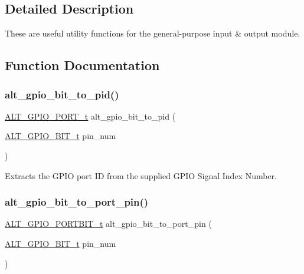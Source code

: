 \subsection{Detailed Description}
These are useful utility functions for the general-\/purpose input \& output module. 

\subsection{Function Documentation}
\mbox{\label{group__ALT__GPIO__UTILITY_gab9f4dc7b353a6152d22205dcc1b62e4c}} 
\subsubsection{\texorpdfstring{alt\_gpio\_bit\_to\_pid()}{alt\_gpio\_bit\_to\_pid()}}
{\footnotesize\ttfamily \mbox{\hyperlink{group__ALT__GPIO__API__CONFIG_gaaf1cf0e2a720d20cd883810f2b59097e}{A\+L\+T\+\_\+\+G\+P\+I\+O\+\_\+\+P\+O\+R\+T\+\_\+t}} alt\+\_\+gpio\+\_\+bit\+\_\+to\+\_\+pid (\begin{DoxyParamCaption}\item[{\mbox{\hyperlink{group__ALT__GPIO__BITVIEW_ga6d149a5961bef8b91b8108e3838b1e09}{A\+L\+T\+\_\+\+G\+P\+I\+O\+\_\+1\+B\+I\+T\+\_\+t}}}]{pin\+\_\+num }\end{DoxyParamCaption})}

Extracts the G\+P\+IO port ID from the supplied G\+P\+IO Signal Index Number. \mbox{\label{group__ALT__GPIO__UTILITY_gabb884ac27ac7812efe6286a5162f6241}} 
\subsubsection{\texorpdfstring{alt\_gpio\_bit\_to\_port\_pin()}{alt\_gpio\_bit\_to\_port\_pin()}}
{\footnotesize\ttfamily \mbox{\hyperlink{group__ALT__GPIO__API__CONFIG_gae4215fdba724cf1aa2ddefdcadabe622}{A\+L\+T\+\_\+\+G\+P\+I\+O\+\_\+\+P\+O\+R\+T\+B\+I\+T\+\_\+t}} alt\+\_\+gpio\+\_\+bit\+\_\+to\+\_\+port\+\_\+pin (\begin{DoxyParamCaption}\item[{\mbox{\hyperlink{group__ALT__GPIO__BITVIEW_ga6d149a5961bef8b91b8108e3838b1e09}{A\+L\+T\+\_\+\+G\+P\+I\+O\+\_\+1\+B\+I\+T\+\_\+t}}}]{pin\+\_\+num }\end{DoxyParamCaption})}

